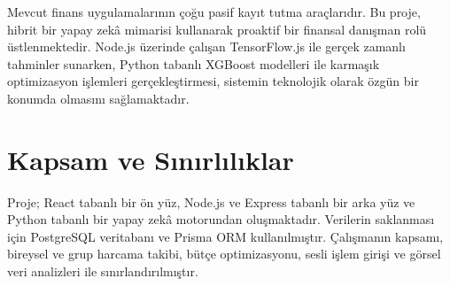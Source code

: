 Mevcut finans uygulamalarının çoğu pasif kayıt tutma araçlarıdır. Bu proje, hibrit bir yapay zekâ mimarisi kullanarak proaktif bir finansal danışman rolü üstlenmektedir. Node.js üzerinde çalışan TensorFlow.js ile gerçek zamanlı tahminler sunarken, Python tabanlı XGBoost modelleri ile karmaşık optimizasyon işlemleri gerçekleştirmesi, sistemin teknolojik olarak özgün bir konumda olmasını sağlamaktadır.

\section{Kapsam ve Sınırlılıklar}\label{kapsam}

Proje; React tabanlı bir ön yüz, Node.js ve Express tabanlı bir arka yüz ve Python tabanlı bir yapay zekâ motorundan oluşmaktadır. Verilerin saklanması için PostgreSQL veritabanı ve Prisma ORM kullanılmıştır. Çalışmanın kapsamı, bireysel ve grup harcama takibi, bütçe optimizasyonu, sesli işlem girişi ve görsel veri analizleri ile sınırlandırılmıştır. 
